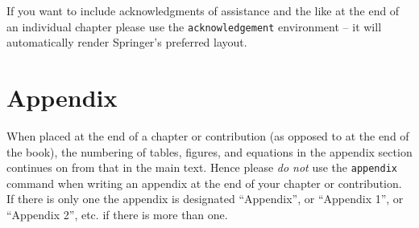 \begin{acknowledgement}
If you want to include acknowledgments of assistance and the like at the end of an individual chapter please use the \verb|acknowledgement| environment -- it will automatically render Springer's preferred layout.
\end{acknowledgement}
%
\section*{Appendix}
%
When placed at the end of a chapter or contribution (as opposed to at the end of the book), the numbering of tables, figures, and equations in the appendix section continues on from that in the main text. Hence please \textit{do not} use the \verb|appendix| command when writing an appendix at the end of your chapter or contribution. If there is only one the appendix is designated ``Appendix'', or ``Appendix 1'', or ``Appendix 2'', etc. if there is more than one.


